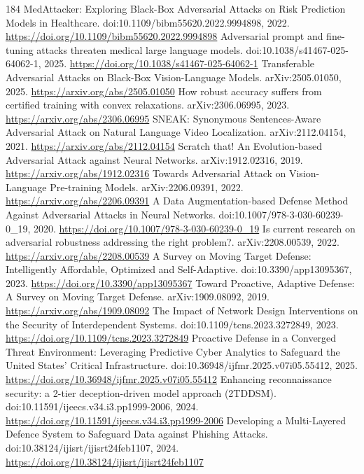\documentclass[11pt]{article}
\begin{document}
\begin{thebibliography}{184}
 MedAttacker: Exploring Black-Box Adversarial Attacks on Risk Prediction Models in Healthcare. doi:10.1109/bibm55620.2022.9994898, 2022. \url{https://doi.org/10.1109/bibm55620.2022.9994898}
 Adversarial prompt and fine-tuning attacks threaten medical large language models. doi:10.1038/s41467-025-64062-1, 2025. \url{https://doi.org/10.1038/s41467-025-64062-1}
 Transferable Adversarial Attacks on Black-Box Vision-Language Models. arXiv:2505.01050, 2025. \url{https://arxiv.org/abs/2505.01050}
 How robust accuracy suffers from certified training with convex relaxations. arXiv:2306.06995, 2023. \url{https://arxiv.org/abs/2306.06995}
 SNEAK: Synonymous Sentences-Aware Adversarial Attack on Natural Language Video Localization. arXiv:2112.04154, 2021. \url{https://arxiv.org/abs/2112.04154}
 Scratch that! An Evolution-based Adversarial Attack against Neural Networks. arXiv:1912.02316, 2019. \url{https://arxiv.org/abs/1912.02316}
 Towards Adversarial Attack on Vision-Language Pre-training Models. arXiv:2206.09391, 2022. \url{https://arxiv.org/abs/2206.09391}
 A Data Augmentation-based Defense Method Against Adversarial Attacks in Neural Networks. doi:10.1007/978-3-030-60239-0\_19, 2020. \url{https://doi.org/10.1007/978-3-030-60239-0_19}
 Is current research on adversarial robustness addressing the right problem?. arXiv:2208.00539, 2022. \url{https://arxiv.org/abs/2208.00539}
 A Survey on Moving Target Defense: Intelligently Affordable, Optimized and Self-Adaptive. doi:10.3390/app13095367, 2023. \url{https://doi.org/10.3390/app13095367}
 Toward Proactive, Adaptive Defense: A Survey on Moving Target Defense. arXiv:1909.08092, 2019. \url{https://arxiv.org/abs/1909.08092}
 The Impact of Network Design Interventions on the Security of Interdependent Systems. doi:10.1109/tcns.2023.3272849, 2023. \url{https://doi.org/10.1109/tcns.2023.3272849}
 Proactive Defense in a Converged Threat Environment: Leveraging Predictive Cyber Analytics to Safeguard the United States' Critical Infrastructure. doi:10.36948/ijfmr.2025.v07i05.55412, 2025. \url{https://doi.org/10.36948/ijfmr.2025.v07i05.55412}
 Enhancing reconnaissance security: a 2-tier deception-driven model approach (2TDDSM). doi:10.11591/ijeecs.v34.i3.pp1999-2006, 2024. \url{https://doi.org/10.11591/ijeecs.v34.i3.pp1999-2006}
 Developing a Multi-Layered Defence System to Safeguard Data against Phishing Attacks. doi:10.38124/ijisrt/ijisrt24feb1107, 2024. \url{https://doi.org/10.38124/ijisrt/ijisrt24feb1107}

\end{thebibliography}
\end{document}
